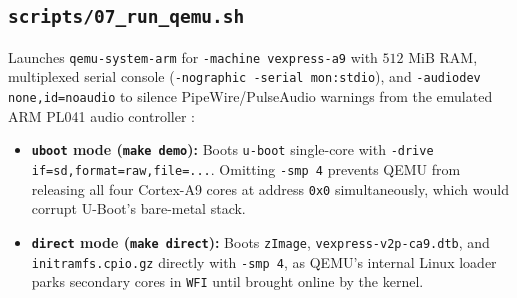 \documentclass[11pt,a4paper]{article}
\begin{document}
\subsection{\texttt{scripts/07\_run\_qemu.sh}}
Launches \texttt{qemu-system-arm} for \texttt{-machine vexpress-a9} with $512\text{ MiB}$ RAM, multiplexed serial console (\texttt{-nographic -serial mon:stdio}), and \texttt{-audiodev none,id=noaudio} to silence PipeWire/PulseAudio warnings from the emulated ARM PL041 audio controller \cite{qemu_vexpress}:
\begin{itemize}
\item \textbf{\texttt{uboot} mode (\texttt{make demo}):} Boots \texttt{u-boot} single-core with \texttt{-drive if=sd,format=raw,file=...}. Omitting \texttt{-smp 4} prevents QEMU from releasing all four Cortex-A9 cores at address \texttt{0x0} simultaneously, which would corrupt U-Boot's bare-metal stack.
\item \textbf{\texttt{direct} mode (\texttt{make direct}):} Boots \texttt{zImage}, \texttt{vexpress-v2p-ca9.dtb}, and \texttt{initramfs.cpio.gz} directly with \texttt{-smp 4}, as QEMU's internal Linux loader parks secondary cores in \texttt{WFI} until brought online by the kernel.
\end{itemize}
\end{document}
